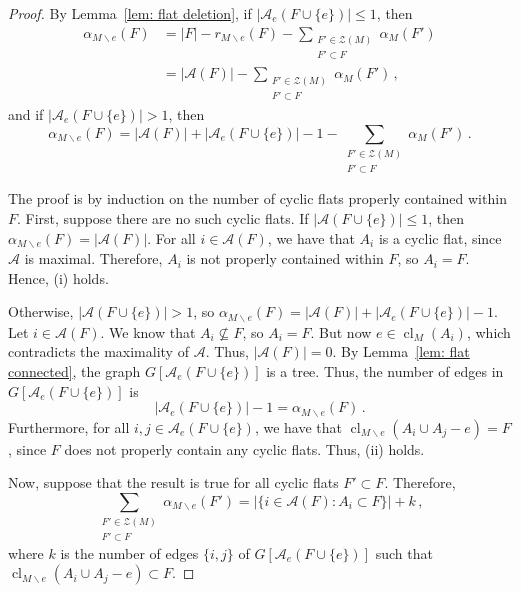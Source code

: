 \documentclass[10pt,a4paper]{amsart}
\DeclareMathOperator{\cl}{cl}
\begin{document}
\begin{proof}
By Lemma~\ref{lem: flat deletion}, if $|\mathcal A_e(F \cup \{e\})| \leq 1$, then
\begin{align*}
\alpha_{M \backslash e}(F) &= |F| - r_{M \backslash e}(F) - \sum_{\substack{F' \in \mathcal Z(M) \\ F' \subset F}} \alpha_M(F') \\
&= |\mathcal A(F)| - \sum_{\substack{F' \in \mathcal Z(M) \\ F' \subset F}} \alpha_M(F') \,,
\end{align*}
and if $|\mathcal A_e(F \cup \{e\})| > 1$, then
$$
\alpha_{M \backslash e}(F) = |\mathcal A(F)| + |\mathcal A_e(F \cup \{e\})| - 1 - \sum_{\substack{F' \in \mathcal Z(M) \\ F' \subset F}} \alpha_M(F') \,.
$$
	
The proof is by induction on the number of cyclic flats properly contained within $F$. First, suppose there are no such cyclic flats. If $|\mathcal A(F \cup \{e\})| \leq 1$, then $\alpha_{M \backslash e}(F) = |\mathcal A(F)|$. For all $i \in \mathcal A(F)$, we have that $A_i$ is a cyclic flat, since $\mathcal A$ is maximal. Therefore, $A_i$ is not properly contained within $F$, so $A_i = F$. Hence, (i) holds.

Otherwise, $|\mathcal A(F \cup \{e\})| > 1$, so $\alpha_{M \backslash e}(F) = |\mathcal A(F)| + |\mathcal A_e(F \cup \{e\})| - 1$. Let $i \in \mathcal A(F)$. We know that $A_i \not\subseteq F$, so $A_i = F$. But now $e \in \cl_M(A_i)$, which contradicts the maximality of $\mathcal A$. Thus, $|\mathcal A(F)| = 0$. By Lemma~\ref{lem: flat connected}, the graph $G[\mathcal A_e(F \cup \{e\})]$ is a tree. Thus, the number of edges in $G[\mathcal A_e(F \cup \{e\})]$ is
$$
|\mathcal A_e(F \cup \{e\})| - 1 = \alpha_{M \backslash e}(F) \,.
$$
Furthermore, for all $i, j \in \mathcal A_e(F \cup \{e\})$, we have that $\cl_{M \backslash e}(A_i \cup A_j - e) = F$, since $F$ does not properly contain any cyclic flats. Thus, (ii) holds.

Now, suppose that the result is true for all cyclic flats $F' \subset F$. Therefore,
$$
\sum_{\substack{F' \in \mathcal Z(M) \\ F' \subset F}} \alpha_{M \backslash e}(F') = |\{i \in \mathcal A(F) : A_i \subset F\}| + k \,,
$$
where $k$ is the number of edges $\{i,j\}$ of $G[\mathcal A_e(F \cup \{e\})]$ such that $\cl_{M \backslash e}(A_i \cup A_j - e) \subset F$.


\end{proof}
\end{document}
